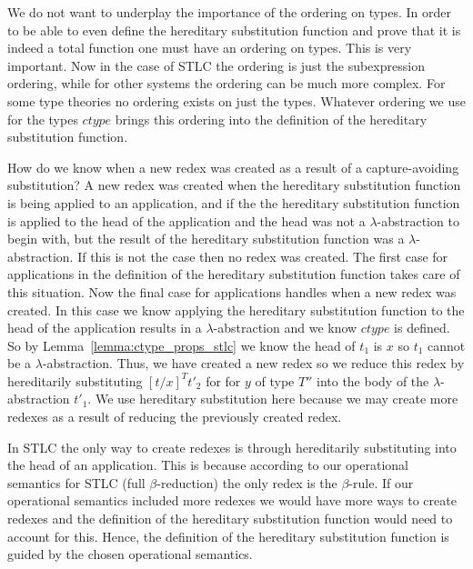 \documentclass{article}
\begin{document}
We do not want to underplay the importance of the ordering on types.
In order to be able to even define the hereditary substitution
function and prove that it is indeed a total function one must have an
ordering on types.  This is very important.  Now in the case of STLC
the ordering is just the subexpression ordering, while for other
systems the ordering can be much more complex.  For some type theories
no ordering exists on just the types.  Whatever ordering we use for
the types $ctype$ brings this ordering into the definition of the
hereditary substitution function.

How do we know when a new redex was created as a result of a
capture-avoiding substitution?  A new redex was created when the
hereditary substitution function is being applied to an application,
and if the the hereditary substitution function is applied to the head
of the application and the head was not a $\lambda$-abstraction to
begin with, but the result of the hereditary substitution function was
a $\lambda$-abstraction.  If this is not the case then no redex was
created.  The first case for applications in the definition of the
hereditary substitution function takes care of this situation.  Now
the final case for applications handles when a new redex was created.
In this case we know applying the hereditary substitution function to
the head of the application results in a $\lambda$-abstraction and we
know $ctype$ is defined.  So by
Lemma~\ref{lemma:ctype_props_stlc} we know the head of $t_1$ is $x$ so
$t_1$ cannot be a $\lambda$-abstraction.  Thus, we have created a new
redex so we reduce this redex by hereditarily substituting 
$[t/x]^T t'_2$ for for $y$ of type $T''$ into the body of the
$\lambda$-abstraction $t'_1$.  We use hereditary substitution here
because we may create more redexes as a result of reducing the
previously created redex.

In STLC the only way to create redexes is through hereditarily
substituting into the head of an application.  This is because
according to our operational semantics for STLC (full
$\beta$-reduction) the only redex is the $\beta$-rule.  If our
operational semantics included more redexes we would have more ways to
create redexes and the definition of the hereditary substitution
function would need to account for this.  Hence, the definition of the
hereditary substitution function is guided by the chosen operational
semantics.  
\end{document}

